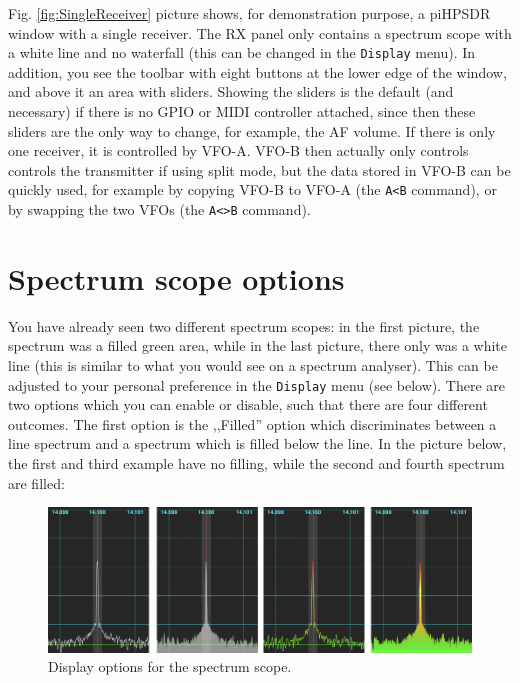 \documentclass[12pt]{book}
\def\bltt#1{\texttt{\color{blue}#1}}
\def\pH{pi\-HPSDR\xspace}
\begin{document}
 Fig. \ref{fig:SingleReceiver} picture shows, for demonstration purpose, a \pH
 window with a single receiver.
 The RX panel only contains a
 spectrum scope with a white line and no waterfall (this can be changed in the
 \bltt{Display} menu). In addition, you see the toolbar
 with eight buttons at the lower edge of the window, and above
 it an area with sliders. Showing the sliders is the default
 (and necessary) if there is no GPIO or MIDI controller attached,
 since then these sliders are the only way to change, for example,
 the AF volume. If there is only one receiver, it is controlled
 by VFO-A. VFO-B then actually only controls controls the transmitter
 if using split mode, but the data stored in VFO-B can
 be quickly used, for example by copying VFO-B to VFO-A (the
 \bltt{A<B} command), or by swapping the two VFOs (the \bltt{A<>B} command).

\section{Spectrum scope options}
\label{sec:FillingGradient}

You have already seen two different spectrum scopes: in the first
picture, the  spectrum was a filled green area, while in the last
picture, there only was a white line (this is similar to what you
would see on a spectrum analyser). This can be adjusted to your
personal preference in the \bltt{Display} menu (see below). There
are two options which you can enable or disable, such that there
are four different outcomes. The first option is the ,,Filled'' option
which discriminates between a line spectrum and a spectrum which is
filled below the line. In the picture below, the first and third
example have no filling, while the second and fourth spectrum
are filled:

\begin{figure}[ht]
\center
\includegraphics[width=12cm]{ScopeFilling.png}
\caption{Display options for the spectrum scope.}
\end{figure}
\end{document}
